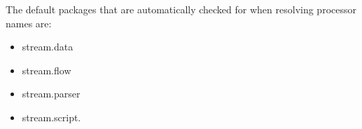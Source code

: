 The default packages that are automatically checked for when resolving processor names are:
\begin{itemize}
  \item {\ttfamily stream.data}
  \item {\ttfamily stream.flow}
  \item {\ttfamily stream.parser}
  \item {\ttfamily stream.script}.
\end{itemize}









